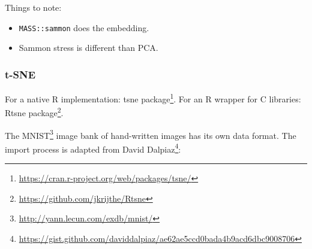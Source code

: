 \documentclass[]{book}
\providecommand{\tightlist}{%
  \setlength{\itemsep}{0pt}\setlength{\parskip}{0pt}}
\renewcommand{\href}[2]{#2\footnote{\url{#1}}}
\theoremstyle{definition}
\theoremstyle{definition}
\theoremstyle{definition}
\theoremstyle{remark}
\begin{document}
Things to note:

\begin{itemize}
\tightlist
\item
  \texttt{MASS::sammon} does the embedding.
\item
  Sammon stress is different than PCA.
\end{itemize}

\hypertarget{t-sne-1}{%
\subsubsection{t-SNE}\label{t-sne-1}}

For a native R implementation: \href{https://cran.r-project.org/web/packages/tsne/}{tsne package}.
For an R wrapper for C libraries: \href{https://github.com/jkrijthe/Rtsne}{Rtsne package}.

The \href{http://yann.lecun.com/exdb/mnist/}{MNIST} image bank of hand-written images has its own data format. The import process is adapted from \href{https://gist.github.com/daviddalpiaz/ae62ae5ccd0bada4b9acd6dbc9008706}{David Dalpiaz}:
\end{document}
